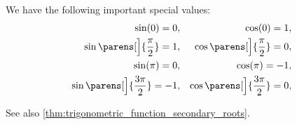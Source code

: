 \begin{proposition}\label{thm:trigonometric_function_basic_roots}
  We have the following important special values:
  \begin{align}
    \sin(0) = 0,                              && \cos(0) = 1,                             \label{eq:thm:trigonometric_function_basic_roots/zero} \\
    \sin\parens[\Big]{ \frac \pi 2 } = 1,     && \cos\parens[\Big]{ \frac \pi 2 } = 0,    \label{eq:thm:trigonometric_function_basic_roots/half} \\
    \sin(\pi) = 0,                            && \cos(\pi) = -1,                          \label{eq:thm:trigonometric_function_basic_roots/whole} \\
    \sin\parens[\Big]{ \frac {3\pi} 2 } = -1, && \cos\parens[\Big]{ \frac {3\pi} 2 } = 0, \label{eq:thm:trigonometric_function_basic_roots/sesqui}
  \end{align}
\end{proposition}
\begin{comments}
  \item See also \cref{thm:trigonometric_function_secondary_roots}.
\end{comments}

